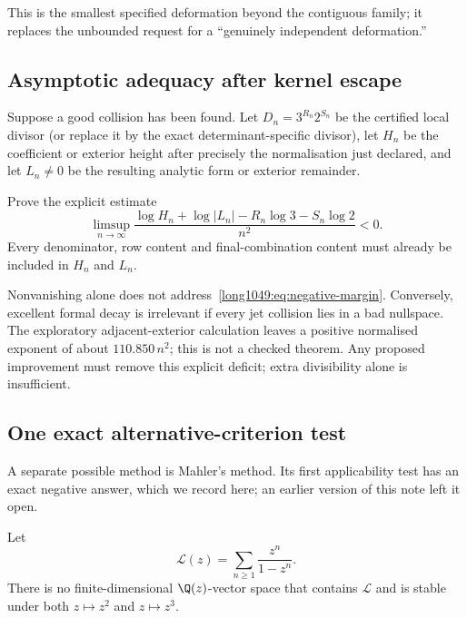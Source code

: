 \documentclass[11pt]{article}
\begin{document}
This is the smallest specified deformation beyond the contiguous family; it
replaces the unbounded request for a “genuinely independent deformation.”

\subsection{Asymptotic adequacy after kernel escape}

Suppose a good collision has been found.  Let $D_n=3^{R_n}2^{S_n}$ be the
certified local divisor (or replace it by the exact determinant-specific
divisor), let $H_n$ be the coefficient or exterior height after precisely the
normalisation just declared, and let $L_n\ne0$ be the resulting analytic form
or exterior remainder.

\begin{problem}
Prove the explicit estimate
\[
 \limsup_{n\to\infty}
 \frac{\log H_n+\log|L_n|-R_n\log3-S_n\log2}{n^2}<0.
\tag{8.3}\label{long1049:eq:negative-margin}
\]
Every denominator, row content and final-combination content must already be
included in $H_n$ and $L_n$.
\end{problem}

Nonvanishing alone does not address~\eqref{long1049:eq:negative-margin}.  Conversely,
excellent formal decay is irrelevant if every jet collision lies in a bad
nullspace.  The exploratory adjacent-exterior calculation leaves a positive
normalised exponent of about $110.850\,n^2$; this is not a checked theorem.
Any proposed improvement must remove this explicit deficit; extra divisibility
alone is insufficient.

\subsection{One exact alternative-criterion test}

A separate possible method is Mahler's method.  Its first applicability test has
an exact negative answer, which we record here; an earlier version of this note
left it open.

\begin{proposition}\label{long1049:res:nomahler}
Let
\[
 \mathcal L(z)=\sum_{n\ge1}\frac{z^n}{1-z^n}.
\]
There is no finite-dimensional $\Q(z)$-vector space that contains $\mathcal L$
and is stable under both $z\mapsto z^2$ and $z\mapsto z^3$.
\end{proposition}
\end{document}
